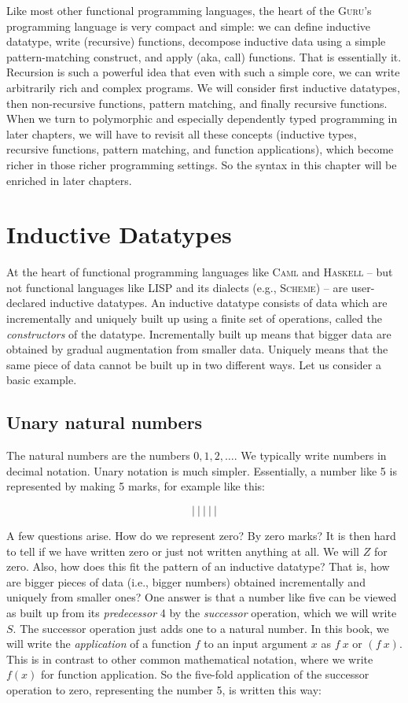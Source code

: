 \documentclass{book}[12pt]
\newcommand{\guru}[0]{\textsc{Guru}}
\begin{document}
Like most other functional programming languages, the heart of the
\guru's programming language is very compact and simple: we can define
inductive datatype, write (recursive) functions, decompose inductive
data using a simple pattern-matching construct, and apply (aka, call)
functions.  That is essentially it.  Recursion is such a powerful idea
that even with such a simple core, we can write arbitrarily rich and
complex programs.  We will consider first inductive datatypes, then
non-recursive functions, pattern matching, and finally recursive
functions.  When we turn to polymorphic and especially dependently
typed programming in later chapters, we will have to revisit all these
concepts (inductive types, recursive functions, pattern matching, and
function applications), which become richer in those richer
programming settings.  So the syntax in this chapter will be enriched
in later chapters.

\section{Inductive Datatypes}

At the heart of functional programming languages like \textsc{Caml}
and \textsc{Haskell} -- but not functional languages like
\textsc{LISP} and its dialects (e.g., \textsc{Scheme}) -- are
user-declared inductive datatypes.  An inductive datatype consists of
data which are incrementally and uniquely built up using a finite set
of operations, called the \emph{constructors} of the datatype.
Incrementally built up means that bigger data are obtained by gradual
augmentation from smaller data.  Uniquely means that the same piece of
data cannot be built up in two different ways.  Let us consider a
basic example.

\subsection{Unary natural numbers}

The natural numbers are the numbers $0,1,2,\ldots$.  We typically
write numbers in decimal notation.  Unary notation is much simpler.
Essentially, a number like 5 is represented by making 5 marks, for
example like this:

\[ |\ |\ |\ |\ | \]

\noindent A few questions arise.  How do we represent zero?  By zero
marks?  It is then hard to tell if we have written zero or just not
written anything at all.  We will $Z$ for zero.  Also, how does this
fit the pattern of an inductive datatype?  That is, how are bigger
pieces of data (i.e., bigger numbers) obtained incrementally and
uniquely from smaller ones?  One answer is that a number like five can
be viewed as built up from its \emph{predecessor} 4 by the
\emph{successor} operation, which we will write $S$.  The successor
operation just adds one to a natural number.  In this book, we will
write the \emph{application} of a function $f$ to an input argument
$x$ as $f\ x$ or $(f\ x)$.  This is in contrast to other common
mathematical notation, where we write $f(x)$ for function application.
So the five-fold application of the successor operation to zero,
representing the number 5, is written this way:
\end{document}
